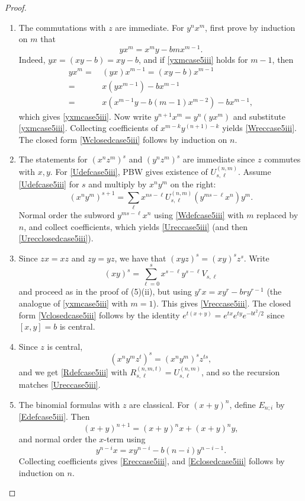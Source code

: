 \documentclass{amsart}
\theoremstyle{definition}
\theoremstyle{remark}
\numberwithin{equation}{section}
\begin{document}
\begin{proof}
\begin{enumerate}
\item [\rm (1)] The commutations with $z$ are immediate. For $y^n x^m$, first prove by induction on $m$ that
\begin{equation}\label{yxmcase5iii}
yx^m=x^m y-bm x^{m-1}.
\end{equation}
Indeed, $yx = (xy-b) = xy - b$, and if \eqref{yxmcase5iii} holds for $m-1$, then
\begin{align*}
yx^m = &\, (yx)x^{m-1}=(xy-b)x^{m-1} \\
= &\, x(yx^{m-1})-b x^{m-1} \\
= &\, x(x^{m-1}y-b(m-1)x^{m-2})-b x^{m-1},
\end{align*}
which gives \eqref{yxmcase5iii}. Now write $y^{n+1}x^m=y^n(yx^m)$ and substitute \eqref{yxmcase5iii}.
Collecting coefficients of $x^{m-k}y^{(n+1)-k}$ yields \eqref{Wreccase5iii}. The closed form \eqref{Wclosedcase5iii} follows by induction on $n$.

\item [\rm (2)] The statements for $(x^n z^m)^s$ and $(y^n z^m)^s$ are immediate since $z$ commutes with $x,y$. For \eqref{Udefcase5iii}, PBW gives existence of $U^{(n,m)}_{s,\ell}$.
Assume \eqref{Udefcase5iii} for $s$ and multiply by $x^n y^m$ on the right:
\[
(x^n y^m)^{s+1}=\sum_{\ell}x^{ns-\ell}U^{(n,m)}_{s,\ell} (y^{ms-\ell}x^n) y^m.
\]
Normal order the subword $y^{ms-\ell}x^n$ using \eqref{Wdefcase5iii} with $m$ replaced by $n$, and collect coefficients, which yields \eqref{Ureccase5iii} (and then \eqref{Urecclosedcase5iii}).

\item [\rm (3)] Since $zx = xz$ and $zy = yz$, we have that $(xyz)^s=(xy)^s z^s$.
Write 
$$
(xy)^s=\sum_{\ell=0}^s x^{s-\ell}y^{s-\ell}V_{s,\ell}
$$ 
and proceed as in the proof of (5)(ii), but using $y^{r}x=x y^{r}-br y^{r-1}$ (the analogue of \eqref{yxmcase5iii} with $m=1$).
This gives \eqref{Vreccase5iii}. The closed form \eqref{Vclosedcase5iii} follows by the identity $e^{t(x+y)}=e^{tx}e^{ty}e^{-bt^2/2}$ since $[x,y] = b$ is central.

\item [\rm (4)] Since $z$ is central,
\[
\left(x^n y^m z^t\right)^s = \left(x^n y^m\right)^s z^{ts},
\]
and we get \eqref{Rdefcase5iii} with $R^{(n,m,t)}_{s,\ell}=U^{(n,m)}_{s,\ell}$, and so the recursion matches \eqref{Ureccase5iii}.

\item [\rm (5)] The binomial formulas with $z$ are classical. For $(x+y)^n$, define $E_{n;i}$ by \eqref{Edefcase5iii}.
Then
\[
(x+y)^{n+1}=(x+y)^n x+(x+y)^n y,
\]
and normal order the $x$-term using 
$$
y^{n-i}x=x y^{n-i}-b(n-i)y^{n-i-1}.
$$
Collecting coefficients gives \eqref{Ereccase5iii}, and \eqref{Eclosedcase5iii} follows by induction on $n$.
\end{enumerate}
\end{proof}
\end{document}
